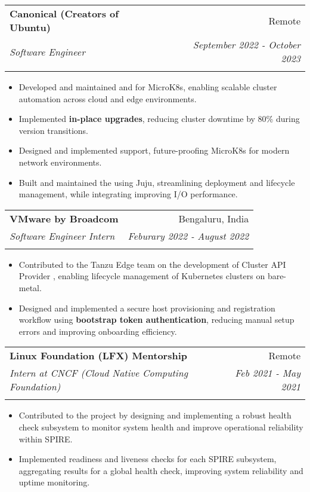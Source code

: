 \documentclass[letterpaper,10pt]{article}
\makeatletter
\newcommand{\resumeItem}[2]{
  \item\small{
    \textbf{#1}{#2 \vspace{-2pt}}
  }
}
\newcommand{\resumeSubheading}[5]{
  \vspace{4pt}\item
    \begin{tabular*}{0.97\textwidth}[t]{l@{\extracolsep{\fill}}r}
      \textbf{#1} & #2 \\
      \textit{\small#3} & \textit{\small #4} \\
      \textit{\small#5}
    \end{tabular*}\vspace{-5pt}
}
\newcommand{\resumeItemListStart}{\begin{itemize}}
\newcommand{\resumeItemListEnd}{\end{itemize}\vspace{-5pt}}
\makeatother
\begin{document}
    \resumeSubheading
    {Canonical (Creators of Ubuntu)}{Remote}
    {Software Engineer} {September 2022 - October 2023}
    {\href{https://canonical.com/}{\color{MidnightBlue}{https://canonical.com/}}}
    \resumeItemListStart
    \resumeItem{}
    {Developed and maintained \href{https://github.com/canonical/cluster-api-control-plane-provider-microk8s/pulls?q=is\%3Apr+author\%3Asachinkumarsingh092}{\color{MidnightBlue}{Cluster API control-plane}} and \href{https://github.com/canonical/cluster-api-bootstrap-provider-microk8s/pulls?q=is\%3Apr+author\%3Asachinkumarsingh092}{\color{MidnightBlue}{bootstrap providers}} for MicroK8s, enabling scalable cluster automation across cloud and edge environments.}
    \resumeItem{}
    {Implemented \textbf{in-place upgrades}, reducing cluster downtime by 80\% during version transitions.}
    \resumeItem{}
    {Designed and implemented \href{https://github.com/canonical/microk8s/pulls?page=1&q=is\%3Apr+author\%3Asachinkumarsingh092}{\color{MidnightBlue}{dual-stack (IPv4 + IPv6)}} support, future-proofing MicroK8s for modern network environments.}
    \resumeItem{}
    {Built and maintained the \href{https://github.com/canonical/charm-microk8s/pulls?q=is\%3Apr+author\%3Asachinkumarsingh092}{\color{MidnightBlue}{MicroK8s charm}} using Juju, streamlining deployment and lifecycle management, while integrating \href{https://github.com/canonical/microk8s-core-addons/pulls?q=is\%3Apr+author\%3Asachinkumarsingh092+}{\color{MidnightBlue}{Ceph storage}} improving I/O performance.}
    \resumeItemListEnd


    \resumeSubheading
    {VMware by Broadcom}{Bengaluru, India}
    {Software Engineer Intern} {Feburary 2022 - August 2022}
    {\href{https://www.vmware.com/}{\color{MidnightBlue}{https://www.vmware.com/}}}
    \resumeItemListStart
    \resumeItem{}
    {Contributed to the Tanzu Edge team on the development of Cluster API Provider \href{https://github.com/vmware-tanzu/cluster-api-provider-bringyourownhost}{\color{MidnightBlue}{Bring Your Own Host}}, enabling lifecycle management of Kubernetes clusters on bare-metal.}
    \resumeItem{}
    {Designed and implemented a secure host provisioning and registration workflow using \textbf{bootstrap token authentication}, reducing manual setup errors and improving onboarding efficiency.}
    \resumeItemListEnd


     \resumeSubheading
      {Linux Foundation (LFX) Mentorship}{Remote}
      {Intern at CNCF (Cloud Native Computing Foundation)} {Feb 2021 - May 2021}
      {\href{https://mentorship.lfx.linuxfoundation.org/project/5c4a200d-b81e-4332-bea6-50120fbf28b4}{\color{MidnightBlue}{Mentorship Page}}}
      \resumeItemListStart
	\resumeItem{}
	{Contributed to the {\href{https://spiffe.io/}{\color{MidnightBlue}{SPIFFE/SPIRE}}} project by designing and implementing a robust health check subsystem to monitor system health and improve operational reliability within SPIRE.}
	\resumeItem{}
	{Implemented readiness and liveness checks for each SPIRE subsystem, aggregating results for a global health check, improving system reliability and uptime monitoring.}
     \resumeItemListEnd
\end{document}
